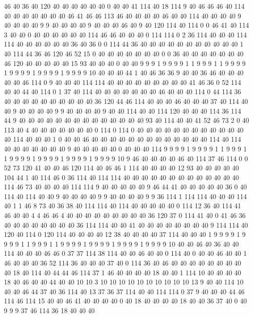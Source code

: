 46 40 36 40 120 40 40 40 40 40 40 0 40 40 41 114 40 18 114 9
40 46 46 46 40 114 40 40 40 40 40 40 40 46 41 46 46 113 46 40
40 40 40 46 40 40 114 40 40 40 40 9 40 40 40 40 9 9 40 40
40 40 9 40 40 40 46 40 9 40 120 114 40 114 0 0 46 41 40 114
3 40 40 0 40 40 40 40 40 40 114 46 46 40 40 40 0 114 114 0
2 36 114 40 40 40 114 114 40 40 40 40 40 40 36 40 36 0 0 114
44 36 40 40 40 40 40 40 40 40 40 40 40 1 40 114 44 36 46 120
46 52 15 0 40 40 40 40 40 40 40 0 0 36 40 40 40 40 40 40
40 46 120 40 40 40 40 40 15 93 40 40 40 0 40 40 9 9 9 1
9 9 9 9 1 1 9 9 9 1 1 9 9 9 9 1 9 9 9 9
1 9 9 9 9 1 9 9 9 9 10 40 40 40 44 1 40 46 36 36
9 40 40 36 46 40 40 40 40 40 46 114 0 9 40 40 40 114 114 40
40 40 40 40 40 40 40 40 41 46 36 0 52 114 40 40 44 40 114 0
1 37 40 114 40 40 40 40 40 40 40 46 40 40 40 114 0 44 114 36
40 40 40 40 40 40 40 40 40 40 36 120 44 46 114 40 40 40 46 40
40 40 37 40 114 40 40 9 40 40 40 40 9 9 40 40 40 40 9 40
40 114 40 40 114 120 40 40 40 114 36 114 44 9 40 40 40 40 40 40
40 40 40 40 40 40 40 40 93 40 114 40 40 41 52 46 73 2 0 40
113 40 4 40 40 40 40 40 40 40 0 114 0 114 0 40 40 40 40 40
40 40 40 40 40 40 40 40 114 40 40 40 1 0 40 40 46 40 40 40
40 40 40 40 40 40 40 40 40 40 114 40 114 40 40 40 40 40 40 40
9 40 40 40 40 40 0 40 40 40 114 9 9 9 9 1 9 9 9 9
1 1 9 9 9 1 1 9 9 9 9 1 9 9 9 9 1 9 9 9
9 1 9 9 9 9 10 9 46 40 40 40 40 46 40 114 37 46 114 0
0 52 73 120 41 40 40 46 120 114 40 46 46 1 114 40 40 40 40 12
93 40 40 40 40 40 104 44 1 40 114 46 0 36 114 40 114 114 40 40
40 40 40 40 40 40 40 40 40 40 40 114 46 73 40 40 40 40 114 114
9 40 40 40 40 40 9 46 44 41 40 40 40 40 40 36 0 40 114 40
114 40 40 9 40 40 40 40 9 9 40 40 40 40 9 9 36 114 1 114
114 40 40 40 114 40 1 1 46 8 73 40 36 38 40 114 114 40 114 40
40 40 40 40 0 114 12 36 40 114 41 46 40 40 4 4 46 46 4 40
40 40 40 40 40 40 40 40 36 120 37 0 114 41 40 0 41 46 36 40
40 40 40 40 40 40 40 36 114 114 40 40 41 40 40 40 40 40 40 40
40 9 114 114 40 120 40 114 0 120 114 40 40 40 40 12 38 40 40 40
40 37 114 40 40 40 1 9 9 9 9 1 9 9 9 9 1 1 9 9
9 1 1 9 9 9 9 1 9 9 9 9 1 9 9 9 9 1 9 9
9 9 10 40 40 46 40 36 40 40 114 40 40 40 46 46 0 37 37 114
38 114 40 40 46 40 40 0 114 40 0 40 40 46 40 40 1 46 40 40
40 36 52 114 36 40 40 40 37 40 0 114 36 40 46 40 40 40 40 40
40 40 40 40 18 40 114 40 44 44 46 114 37 1 46 40 40 40 40 18
40 40 1 114 10 40 40 40 40 18 40 46 40 40 44 40 40 10 10 3
10 10 10 10 10 10 10 10 10 10 13 9 40 40 114 10 40 40 46 44
37 40 36 114 40 13 37 36 37 114 40 40 114 114 0 37 9 40 40 40
44 46 114 46 114 15 40 40 46 41 40 40 40 40 0 40 18 40 40 40
40 18 40 40 36 37 40 0 40 9 9 9 37 46 114 36 18 40 40 40
